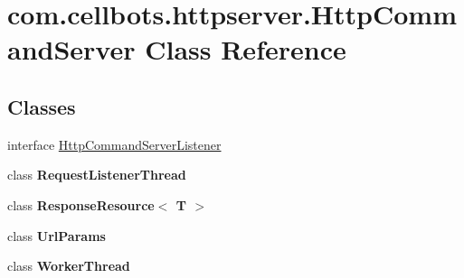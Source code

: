 \hypertarget{classcom_1_1cellbots_1_1httpserver_1_1_http_command_server}{\section{com.\-cellbots.\-httpserver.\-Http\-Command\-Server Class Reference}
\label{classcom_1_1cellbots_1_1httpserver_1_1_http_command_server}
}
\subsection*{Classes}
\begin{DoxyCompactItemize}
\item 
interface \hyperlink{interfacecom_1_1cellbots_1_1httpserver_1_1_http_command_server_1_1_http_command_server_listener}{Http\-Command\-Server\-Listener}
\item 
class {\bfseries Request\-Listener\-Thread}
\item 
class {\bfseries Response\-Resource$<$ T $>$}
\item 
class {\bfseries Url\-Params}
\item 
class {\bfseries Worker\-Thread}
\end{DoxyCompactItemize}
